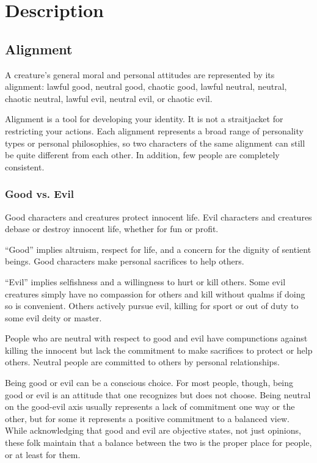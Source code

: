 \chapter{Description}

\section{Alignment}\label{Alignment}
A creature's general moral and personal attitudes are represented by its alignment: lawful good, neutral good, chaotic good, lawful neutral, neutral, chaotic neutral, lawful evil, neutral evil, or chaotic evil.

Alignment is a tool for developing your identity.
It is not a straitjacket for restricting your actions.
Each alignment represents a broad range of personality types or personal philosophies, so two characters of the same alignment can still be quite different from each other.
In addition, few people are completely consistent.

\subsection{Good vs. Evil}
Good characters and creatures protect innocent life. Evil characters and creatures debase or destroy innocent life, whether for fun or profit.

``Good'' implies altruism, respect for life, and a concern for the dignity of sentient beings. Good characters make personal sacrifices to help others.

``Evil'' implies selfishness and a willingness to hurt or kill others. Some evil creatures simply have no compassion for others and kill without qualms if doing so is convenient. Others actively pursue evil, killing for sport or out of duty to some evil deity or master.

People who are neutral with respect to good and evil have compunctions against killing the innocent but lack the commitment to make sacrifices to protect or help others. Neutral people are committed to others by personal relationships.

Being good or evil can be a conscious choice. For most people, though, being good or evil is an attitude that one recognizes but does not choose. Being neutral on the good-evil axis usually represents a lack of commitment one way or the other, but for some it represents a positive commitment to a balanced view. While acknowledging that good and evil are objective states, not just opinions, these folk maintain that a balance between the two is the proper place for people, or at least for them.

